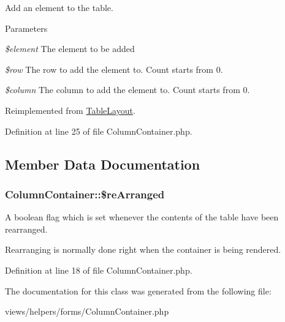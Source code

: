 Add an element to the table. 


\begin{DoxyParams}{Parameters}
\item[{\em \$element}]The element to be added \item[{\em \$row}]The row to add the element to. Count starts from 0. \item[{\em \$column}]The column to add the element to. Count starts from 0. \end{DoxyParams}


Reimplemented from \hyperlink{class_table_layout_a2a65f0d9e3cd5c256625ab2654ba83de}{TableLayout}.



Definition at line 25 of file ColumnContainer.php.



\subsection{Member Data Documentation}
\hypertarget{class_column_container_a58066b1ef3d75aeaebe83efef1927849}{
\subsubsection[{\$reArranged}]{\setlength{\rightskip}{0pt plus 5cm}ColumnContainer::\$reArranged}}
\label{class_column_container_a58066b1ef3d75aeaebe83efef1927849}


A boolean flag which is set whenever the contents of the table have been rearranged. 

Rearranging is normally done right when the container is being rendered. 

Definition at line 18 of file ColumnContainer.php.



The documentation for this class was generated from the following file:\begin{DoxyCompactItemize}
\item 
views/helpers/forms/ColumnContainer.php\end{DoxyCompactItemize}
